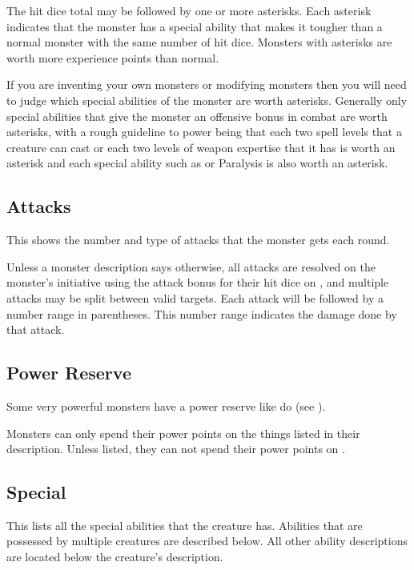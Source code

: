 \begin{multicols*}{2}
The hit dice total may be followed by one or more asterisks. Each asterisk indicates that the monster has a special ability that makes it tougher than a normal monster with the same number of hit dice. Monsters with asterisks are worth more experience points than normal.

If you are inventing your own monsters or modifying monsters then you will need to judge which special abilities of the monster are worth asterisks. Generally only special abilities that give the monster an offensive bonus in combat are worth asterisks, with a rough guideline to power being that each two spell levels that a creature can cast or each two levels of weapon expertise that it has is worth an asterisk and each special ability such as  or Paralysis is also worth an asterisk.

\subsection{Attacks}
This shows the number and type of attacks that the monster gets each round.

Unless a monster description says otherwise, all attacks are resolved on the monster’s initiative using the attack bonus for their hit dice on , and multiple attacks may be split between valid targets. Each attack will be followed by a number range in parentheses. This number range indicates the damage done by that attack.

\subsection{Power Reserve}
Some very powerful monsters have a power reserve like  do (see ).

Monsters can only spend their power points on the things listed in their description. Unless listed, they can not spend their power points on .

\subsection{Special}
This lists all the special abilities that the creature has. Abilities that are possessed by multiple creatures are described below. All other ability descriptions are located below the creature's description.


\end{multicols*}
